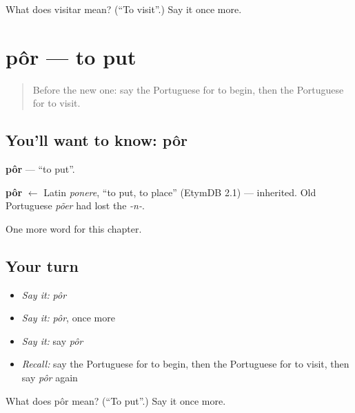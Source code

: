 \begin{tcolorbox}[breakable,colback=teal!4,colframe=teal!35!black,title={Before you move on}]
What does visitar mean? (\textquotedblleft{}To visit\textquotedblright{}.) Say it once more.
\end{tcolorbox}
\section[pôr]{pôr — to put}

\label{lesson:PT-C131-por}



\begin{quote}
Before the new one: say the Portuguese for to begin, then the Portuguese for to visit.
\end{quote}

\subsection*{You'll want to know: pôr}
\textbf{pôr} — \textquotedblleft{}to put\textquotedblright{}.

\begin{cousinweb}
\textbf{pôr} $\leftarrow$ Latin \emph{ponere}, \textquotedblleft{}to put, to place\textquotedblright{} (EtymDB 2.1) — inherited. Old Portuguese \emph{põer} had lost the \emph{-n-}.
\end{cousinweb}

\begin{grammarlens}[title={What you've built}]
One more word for this chapter.
\end{grammarlens}

\subsection*{Your turn}
\begin{itemize}
\raggedright
  \item \emph{Say it:} \emph{pôr}
  \item \emph{Say it:} \emph{pôr}, once more
  \item \emph{Say it:} say \emph{pôr}
  \item \emph{Recall:} say the Portuguese for to begin, then the Portuguese for to visit, then say \emph{pôr} again
\end{itemize}

\begin{tcolorbox}[breakable,colback=teal!4,colframe=teal!35!black,title={Before you move on}]
What does pôr mean? (\textquotedblleft{}To put\textquotedblright{}.) Say it once more.
\end{tcolorbox}
